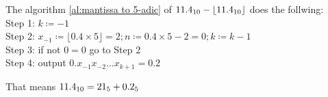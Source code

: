 \documentclass{gadsescript}
\begin{document}
\begin{enumerate}[label=\alph*)]
		The algorithm \ref{al:mantissa to 5-adic} of $ \num{11.4}_{10} - \lfloor \num{11.4}_{10} \rfloor $ does the follwing:\\
		Step 1: $ k \coloneqq -1 $\\
		Step 2: $ x_{-1} \coloneqq \lfloor 0.4 \times 5 \rfloor = 2; n \coloneqq 0.4 \times 5 - 2 = 0; k \coloneqq k - 1 $\\
		Step 3: if not $ 0 = 0 $ go to Step 2\\
		Step 4: output $ 0.x_{-1} x_{-2} \dotso x_{k+1} = 0.2 $

		That means $\num{11.4}_{10} = 21_{5} + 0.2_{5}$

\end{enumerate}
\end{document}
